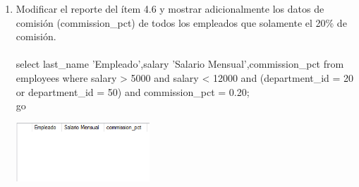\begin{enumerate}[1.]
	\item  Modificar el reporte del ítem 4.6 y mostrar adicionalmente los datos de comisión (commission\_pct) de todos los empleados que solamente el 20\% de comisi\'on.
	\\ \\select last\_name 'Empleado',salary 'Salario Mensual',commission\_pct from employees where salary > 5000 and salary < 12000 and (department\_id = 20 or department\_id = 50) and commission\_pct = 0.20;
	\\go

	\begin{center}
	\includegraphics[width=5cm]{./Imagenes/actividad_04_15} 
	\end{center}

\end{enumerate}

